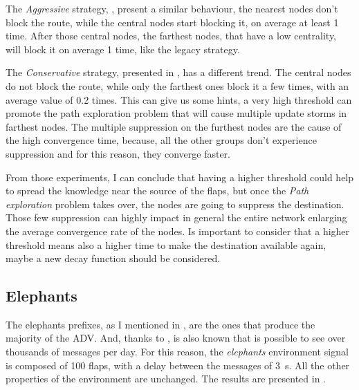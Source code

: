 The \textit{Aggressive} strategy, , present
a similar behaviour, the nearest nodes don't block the route, while the central
nodes start blocking it, on average at least \num{1} time.
After those central nodes, the farthest nodes, that have a low centrality, will
block it on average \num{1} time, like the legacy strategy.

The \textit{Conservative} strategy, presented in ,
has a different trend.
The central nodes do not block the route, while only the farthest
ones block it a few times, with an average value of \num{0.2} times.
This can give us some hints, a very high threshold can promote the path
exploration problem that will cause multiple update storms in farthest nodes.
The multiple suppression on the furthest nodes are the cause of the high convergence time,
because, all the other groups don't experience suppression and for this reason,
they converge faster.

From those experiments, I can conclude that having a higher threshold could help
to spread the knowledge near the source of the flaps, but once the
\textit{Path exploration} problem takes over, the nodes are going to suppress
the destination.
Those few suppression can highly impact in general the entire network enlarging
the average convergence rate of the nodes.
Is important to consider that a higher threshold means also a higher time to
make the destination available again, maybe a new decay function should be considered.


\subsection{Elephants}
\label{subsec:rfd_elephants}


The elephants prefixes, as I mentioned in ,
are the ones that produce the majority of the \ac{ADV}.
And, thanks to \cite{huston2006bgp}, is also known that is possible to see over
thousands of messages per day.
For this reason, the \textit{elephants} environment signal is composed of \num{100}
flaps, with a delay between the messages of \SI{3}{\second}.
All the other properties of the environment are unchanged.
The results are presented in .

